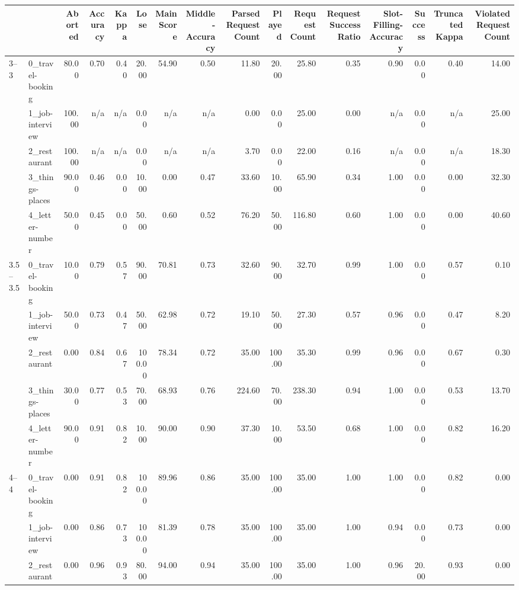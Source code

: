 \begin{tabular}{llrrrrrrrrrrrrrr}
\toprule
 &  & Aborted & Accuracy & Kappa & Lose & Main Score & Middle-Accuracy & Parsed Request Count & Played & Request Count & Request Success Ratio & Slot-Filling-Accuracy & Success & Truncated Kappa & Violated Request Count \\
\midrule
\multirow[t]{5}{*}{3--3} & 0_travel-booking & 80.00 & 0.70 & 0.40 & 20.00 & 54.90 & 0.50 & 11.80 & 20.00 & 25.80 & 0.35 & 0.90 & 0.00 & 0.40 & 14.00 \\
 & 1_job-interview & 100.00 & n/a & n/a & 0.00 & n/a & n/a & 0.00 & 0.00 & 25.00 & 0.00 & n/a & 0.00 & n/a & 25.00 \\
 & 2_restaurant & 100.00 & n/a & n/a & 0.00 & n/a & n/a & 3.70 & 0.00 & 22.00 & 0.16 & n/a & 0.00 & n/a & 18.30 \\
 & 3_things-places & 90.00 & 0.46 & 0.00 & 10.00 & 0.00 & 0.47 & 33.60 & 10.00 & 65.90 & 0.34 & 1.00 & 0.00 & 0.00 & 32.30 \\
 & 4_letter-number & 50.00 & 0.45 & 0.00 & 50.00 & 0.60 & 0.52 & 76.20 & 50.00 & 116.80 & 0.60 & 1.00 & 0.00 & 0.00 & 40.60 \\
\cline{1-16}
\multirow[t]{5}{*}{3.5--3.5} & 0_travel-booking & 10.00 & 0.79 & 0.57 & 90.00 & 70.81 & 0.73 & 32.60 & 90.00 & 32.70 & 0.99 & 1.00 & 0.00 & 0.57 & 0.10 \\
 & 1_job-interview & 50.00 & 0.73 & 0.47 & 50.00 & 62.98 & 0.72 & 19.10 & 50.00 & 27.30 & 0.57 & 0.96 & 0.00 & 0.47 & 8.20 \\
 & 2_restaurant & 0.00 & 0.84 & 0.67 & 100.00 & 78.34 & 0.72 & 35.00 & 100.00 & 35.30 & 0.99 & 0.96 & 0.00 & 0.67 & 0.30 \\
 & 3_things-places & 30.00 & 0.77 & 0.53 & 70.00 & 68.93 & 0.76 & 224.60 & 70.00 & 238.30 & 0.94 & 1.00 & 0.00 & 0.53 & 13.70 \\
 & 4_letter-number & 90.00 & 0.91 & 0.82 & 10.00 & 90.00 & 0.90 & 37.30 & 10.00 & 53.50 & 0.68 & 1.00 & 0.00 & 0.82 & 16.20 \\
\cline{1-16}
\multirow[t]{5}{*}{4--4} & 0_travel-booking & 0.00 & 0.91 & 0.82 & 100.00 & 89.96 & 0.86 & 35.00 & 100.00 & 35.00 & 1.00 & 1.00 & 0.00 & 0.82 & 0.00 \\
 & 1_job-interview & 0.00 & 0.86 & 0.73 & 100.00 & 81.39 & 0.78 & 35.00 & 100.00 & 35.00 & 1.00 & 0.94 & 0.00 & 0.73 & 0.00 \\
 & 2_restaurant & 0.00 & 0.96 & 0.93 & 80.00 & 94.00 & 0.94 & 35.00 & 100.00 & 35.00 & 1.00 & 0.96 & 20.00 & 0.93 & 0.00 \\

\end{tabular}
